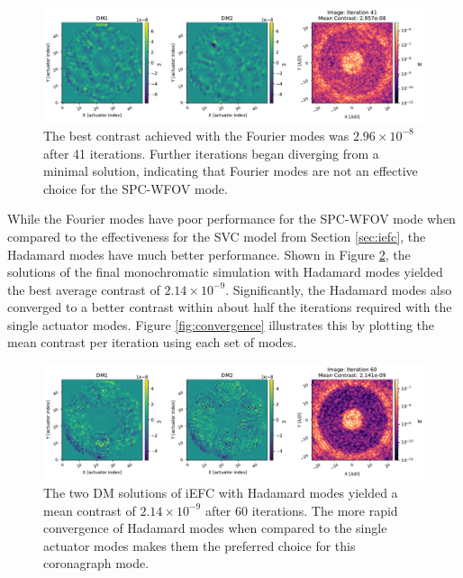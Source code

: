 \documentclass[12pt]{spieman}  %
\begin{document}
\begin{spacing}{2}
\begin{figure}[h]
    \centering
    \includegraphics[scale=0.5]{figs-spc-825/spc_825_fourier_modes_poke_probes.pdf}
    \caption{The best contrast achieved with the Fourier modes was $2.96\times10^{-8}$ after 41 iterations. Further iterations began diverging from a minimal solution, indicating that Fourier modes are not an effective choice for the SPC-WFOV mode.}
    \label{fig:spc-825-fourier_modes}
\end{figure}

While the Fourier modes have poor performance for the SPC-WFOV mode when compared to the effectiveness for the SVC model from Section \ref{sec:iefc}, the Hadamard modes have much better performance. Shown in Figure \ref{fig:spc-825-had_modes}, the solutions of the final monochromatic simulation with Hadamard modes yielded the best average contrast of $2.14\times10^{-9}$. Significantly, the Hadamard modes also converged to a better contrast within about half the iterations required with the single actuator modes. Figure \ref{fig:convergence} illustrates this by plotting the mean contrast per iteration using each set of modes. 

\begin{figure}[h]
    \centering
    \includegraphics[scale=0.5]{figs-spc-825/spc_825_had_modes_poke_probes.pdf}
    \caption{The two DM solutions of iEFC with Hadamard modes yielded a mean contrast of $2.14\times10^{-9}$ after 60 iterations. The more rapid convergence of Hadamard modes when compared to the single actuator modes makes them the preferred choice for this coronagraph mode.}
    \label{fig:spc-825-had_modes}
\end{figure}


\end{spacing}
\end{document}

